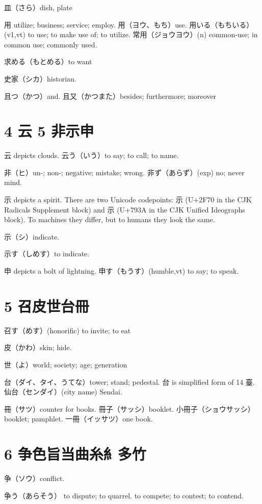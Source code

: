 皿（さら）dish, plate

用 utilize; business; service; employ.
用（ヨウ、もち）use.
用いる（もちいる）(v1,vt) to use; to make use of; to utilize.
常用（ジョウヨウ）(n) common-use; in common use; commonly used.

求める（もとめる）to want

史家（シカ）historian.

且つ（かつ）and.
且又（かつまた）besides; furthermore; moreover

\section{4 云 5 非示申}

云 depicts clouds.
云う（いう）to say; to call; to name.

非（ヒ）un-; non-; negative; mistake; wrong.
非ず（あらず）(exp) no; never mind.

示 depicts a spirit.
There are two Unicode codepoints:
⽰ (U+2F70 in the CJK Radicals Supplement block)
and 示 (U+793A in the CJK Unified Ideographs block).
To machines they differ,
but to humans they look the same.

示（シ）indicate.

示す（しめす）to indicate.

申 depicts a bolt of lightning.
申す（もうす）(humble,vt) to say; to speak.

\section{5 召皮世台冊}

召す（めす）(honorific) to invite; to eat

皮（かわ）skin; hide.

世（よ）world; society; age; generation

台（ダイ、タイ、うてな）tower; stand; pedestal.
台 is simplified form of 14 臺.
仙台（センダイ）(city name) Sendai.

冊（サツ）counter for books.
冊子（サッシ）booklet.
小冊子（ショウサッシ）booklet; pamphlet.
一冊（イッサツ）one book.

\section{6 争色旨当曲糸糹多竹}

争（ソウ）conflict.

争う（あらそう）
to dispute; to quarrel.
to compete; to contest; to contend.

